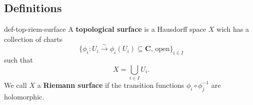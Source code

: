 \documentclass[10pt,]{book}
\newcommand{\terminology}[1]{\textbf{#1}}
\numberwithin{equation}{section}
\newcommand{\CC}{\mathbf{C}}
\begin{document}
\subsection[{Definitions}]{Definitions}\label{subsection-43}
\begin{definition}{}{def-top-riem-surface}%
\hypertarget{p-481}{}%
A \terminology{topological surface} is a Hausdorff space \(X\) wich has a collection of charts%
\begin{equation*}
\{\phi_i \colon U_i \xrightarrow\sim \phi_i(U_i) \subseteq \CC,\,\text{open}\}_{i\in I}
\end{equation*}
such that%
\begin{equation*}
X= \bigcup_{i\in I} U_i\text{.}
\end{equation*}
We call \(X\) a \terminology{Riemann surface} if the transition functions \(\phi_i\circ \phi_j^{-1}\) are holomorphic.%
\end{definition}
%
%
\typeout{************************************************}
\typeout{************************************************}
%
\end{document}
